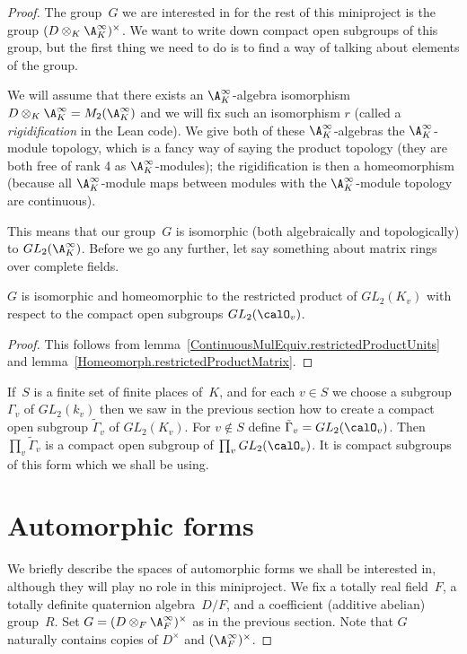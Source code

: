 \begin{proof}
The group~$G$ we are interested in for the rest of this miniproject is the group
$(D\otimes_K\A_K^\infty)^\times$. We want to write down compact open subgroups of this group,
but the first thing we need to do is to find a way of talking about elements of the group.

We will assume that there exists an $\A_K^\infty$-algebra isomorphism
$D\otimes_K\A_K^\infty=M_2(\A_K^\infty)$ and we will fix such an isomorphism $r$
(called a \emph{rigidification} in the Lean code). We give both of these $\A_K^\infty$-algebras
the $\A_K^\infty$-module topology, which is a fancy way of saying the product topology
(they are both free of rank 4 as $\A_K^\infty$-modules); the rigidification is then
a homeomorphism (because all $\A_K^\infty$-module maps between modules with the $\A_K^\infty$-module
topology are continuous).

This means that our group~$G$ is isomorphic (both algebraically and topologically)
to $GL_2(\A_K^\infty)$. Before we go any further,
let say something about matrix rings over complete fields.

\begin{theorem}
  \label{nolean-GL2-finite-adeles}
  $G$ is isomorphic and homeomorphic
  to the restricted product of $GL_2(K_v)$ with respect
  to the compact open subgroups $GL_2(\calO_v)$.
\end{theorem}
\begin{proof}
  This follows from lemma~\ref{ContinuousMulEquiv.restrictedProductUnits}
  and lemma~\ref{Homeomorph.restrictedProductMatrix}.
\end{proof}

If~$S$ is a finite set of finite places of~$K$, and for each $v\in S$ we choose
a subgroup $\Gamma_v$ of $GL_2(k_v)$ then we saw in the previous section how to
create a compact open subgroup $\tilde{\Gamma}_v$ of $GL_2(K_v)$. For $v\notin S$
define $\tilde{\Gamma}_v=GL_2(\calO_v)$. Then $\prod_v\tilde{\Gamma}_v$ is a compact
open subgroup of $\prod_vGL_2(\calO_v)$. It is compact subgroups of this form
which we shall be using.

\section{Automorphic forms}

We briefly describe the spaces of automorphic forms we shall be interested in, although
they will play no role in this miniproject. We fix a totally real field~$F$, a
totally definite quaternion algebra~$D/F$, and a coefficient (additive abelian) group~$R$.
Set $G=(D\otimes_F\A_F^\infty)^\times$ as in the previous section. Note that $G$
naturally contains copies of $D^\times$ and $(\A_F^\infty)^\times$.


\end{proof}
